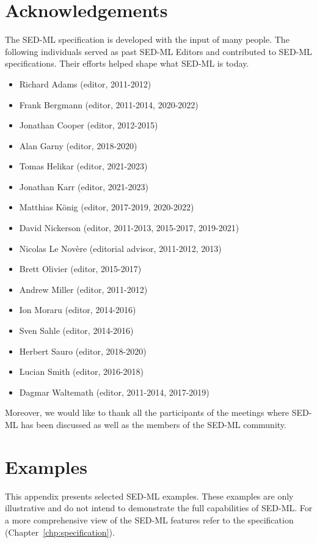 \documentclass[pdftex,rgb,dvipsnames,svgnames,hyperref,table]{report}
\begin{document}
\chapter{Acknowledgements}
\label{chp:acknowledgments}
The SED-ML specification is developed with the input of many people. The following individuals served as past SED-ML Editors and contributed to SED-ML specifications. Their efforts helped shape what SED-ML is today.

\begin{itemize}
\item Richard Adams (editor, 2011-2012)
\item Frank Bergmann (editor, 2011-2014, 2020-2022)
\item Jonathan Cooper (editor, 2012-2015)
\item Alan Garny (editor, 2018-2020)
\item Tomas Helikar (editor, 2021-2023)
\item Jonathan Karr (editor, 2021-2023)
\item Matthias K\"{o}nig (editor, 2017-2019, 2020-2022)
\item David Nickerson (editor, 2011-2013, 2015-2017, 2019-2021)
\item Nicolas Le Nov{\`e}re (editorial advisor, 2011-2012, 2013)
\item Brett Olivier (editor, 2015-2017)
\item Andrew Miller (editor, 2011-2012)
\item Ion Moraru (editor, 2014-2016)
\item Sven Sahle (editor, 2014-2016)
\item Herbert Sauro (editor, 2018-2020)
\item Lucian Smith (editor, 2016-2018)
\item Dagmar Waltemath (editor, 2011-2014, 2017-2019)
\end{itemize}

Moreover, we would like to thank all the participants of the meetings where SED-ML has been discussed as well as the members of the SED-ML community.

\appendix

\chapter{Examples}
\label{app:examples}
This appendix presents selected SED-ML examples. These examples are only illustrative and do not intend to demonstrate the full capabilities of SED-ML. For a more comprehensive view of the SED-ML features refer to the specification (Chapter~\ref{chp:specification}). 
\end{document}
